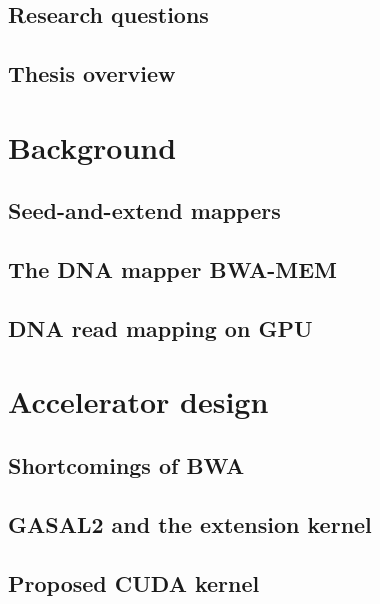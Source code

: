 \documentclass[11pt,twoside]{ce}
\begin{document}
\section{Research questions}


\section{Thesis overview}


\chapter{Background}
\label{chap:background}
\section{Seed-and-extend mappers}


\section{The DNA mapper BWA-MEM}


\section{DNA read mapping on GPU}



\chapter{Accelerator design}
\label{chap:accel}


\section{Shortcomings of BWA}

\section{GASAL2 and the extension kernel}
	

\section{Proposed CUDA kernel}

\end{document}
